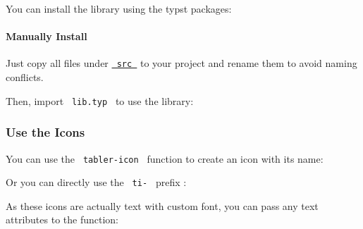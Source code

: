 You can install the library using the typst packages:

\begin{Shaded}
\begin{Highlighting}[]
\end{Highlighting}
\end{Shaded}

\paragraph{Manually Install}\label{manually-install}

Just copy all files under
\href{https://github.com/zyf722/typst-tabler-icons/tree/main/src}{\texttt{\ src\ }}
to your project and rename them to avoid naming conflicts.

Then, import \texttt{\ lib.typ\ } to use the library:

\begin{Shaded}
\begin{Highlighting}[]
\end{Highlighting}
\end{Shaded}

\subsubsection{Use the Icons}\label{use-the-icons}

You can use the \texttt{\ tabler-icon\ } function to create an icon with
its name:

\begin{Shaded}
\begin{Highlighting}[]
\end{Highlighting}
\end{Shaded}

Or you can directly use the \texttt{\ ti-\ } prefix :

\begin{Shaded}
\begin{Highlighting}[]
\end{Highlighting}
\end{Shaded}

As these icons are actually text with custom font, you can pass any text
attributes to the function:

\begin{Shaded}
\begin{Highlighting}[]
\end{Highlighting}
\end{Shaded}

